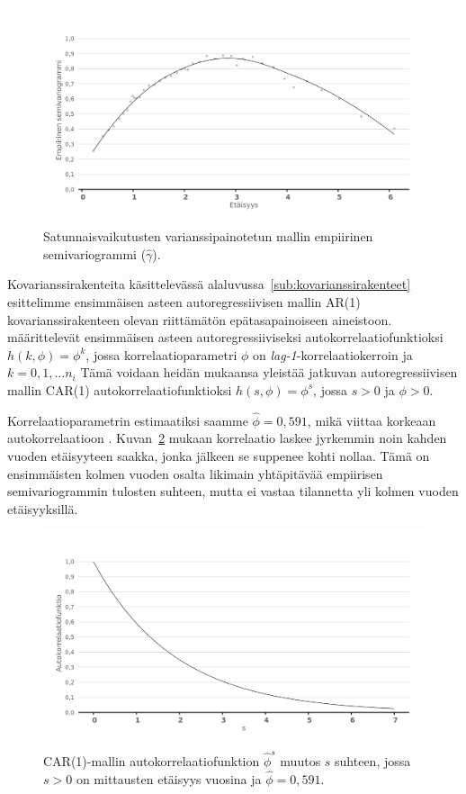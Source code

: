 \documentclass[finnish]{docopts}
\begin{document}
\begin{figure}[H]
\centering
  \includegraphics[scale=0.8]{kuvaajat/lme2_v_vario.png}
  \caption{Satunnaisvaikutusten varianssipainotetun mallin empiirinen semivariogrammi ($\hat{\gamma}$).}
  \label{fig:lme2_v_vario}
\end{figure}

Kovarianssirakenteita käsittelevässä alaluvussa~\ref{sub:kovarianssirakenteet} esittelimme ensimmäisen asteen autoregressiivisen mallin AR(1) kovarianssirakenteen olevan riittämätön epätasapainoiseen aineistoon. \cite{pinheiro00} määrittelevät ensimmäisen asteen autoregressiiviseksi autokorrelaatiofunktioksi $h(k,\phi)=\phi^k$, jossa korrelaatioparametri $\phi$ on \textit{lag-1}-korrelaatiokerroin ja $k=0,1,\dots n_i$ Tämä voidaan heidän mukaansa yleistää jatkuvan autoregressiivisen mallin CAR(1) autokorrelaatiofunktioksi $h(s,\phi)=\phi^s$, jossa $s>0$ ja $\phi>0$.

Korrelaatioparametrin estimaatiksi saamme $\hat{\phi} = 0,591$, mikä viittaa korkeaan autokorrelaatioon \citep{pinheiro00}. Kuvan~\ref{fig:lme2_corfunc} mukaan korrelaatio laskee jyrkemmin noin kahden vuoden etäisyyteen saakka, jonka jälkeen se suppenee kohti nollaa. Tämä on ensimmäisten kolmen vuoden osalta likimain yhtäpitävää empiirisen semivariogrammin tulosten suhteen, mutta ei vastaa tilannetta yli kolmen vuoden etäisyyksillä.\\

\begin{figure}[H]
\centering
  \includegraphics[scale=0.8]{kuvaajat/lme2_corfunc.png}
  \caption{CAR(1)-mallin autokorrelaatiofunktion $\hat{\phi}^s$ muutos $s$ suhteen, jossa $s>0$ on mittausten etäisyys vuosina ja $\hat{\phi} = 0,591$.}
  \label{fig:lme2_corfunc}
\end{figure}
\end{document}
